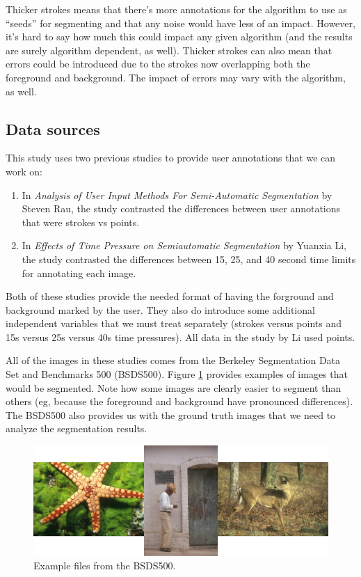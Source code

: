 \documentclass[12pt,a4paper,notitlepage]{article}
\begin{document}
Thicker strokes means that there's more annotations for the algorithm to use as ``seeds'' for segmenting and that any noise would have less of an impact. However, it's hard to say how much this could impact any given algorithm (and the results are surely algorithm dependent, as well). Thicker strokes can also mean that errors could be introduced due to the strokes now overlapping both the foreground and background. The impact of errors may vary with the algorithm, as well.

\subsection{Data sources}
This study uses two previous studies to provide user annotations that we can work on:

\begin{enumerate}
	\item In \textit{Analysis of User Input Methods For Semi-Automatic Segmentation} by Steven Rau\cite{rau}, the study contrasted the differences between user annotations that were strokes vs points.
	\item In \textit{Effects of Time Pressure on Semiautomatic Segmentation} by Yuanxia Li\cite{yuanxia}, the study contrasted the differences between 15, 25, and 40 second time limits for annotating each image.
\end{enumerate}

Both of these studies provide the needed format of having the forground and background marked by the user. They also do introduce some additional independent variables that we must treat separately (strokes versus points and 15s versus 25s versus 40s time pressures). All data in the study by Li used points.

All of the images in these studies comes from the Berkeley Segmentation Data Set and Benchmarks 500\cite{bsds500} (BSDS500). Figure \ref{fig:bsds500_samples} provides examples of images that would be segmented. Note how some images are clearly easier to segment than others (eg, because the foreground and background have pronounced differences). The BSDS500 also provides us with the ground truth images that we need to analyze the segmentation results.

\begin{figure}[h]
	\includegraphics[width=\linewidth]{bsds500_samples}
	\caption{Example files from the BSDS500.}
	\label{fig:bsds500_samples}
\end{figure}
\end{document}
